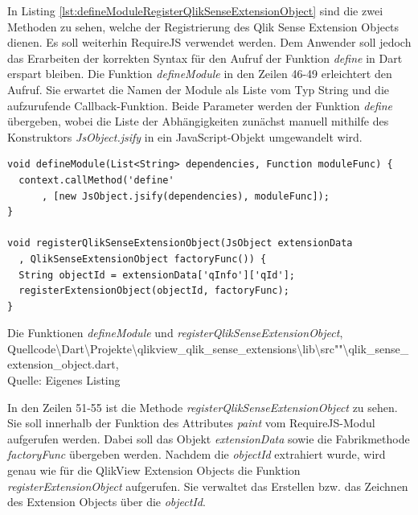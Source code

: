 In Listing \ref{lst:defineModuleRegisterQlikSenseExtensionObject} sind die zwei Methoden zu sehen, welche der Registrierung des Qlik Sense Extension Objects dienen. Es soll weiterhin RequireJS verwendet werden. Dem Anwender soll jedoch das Erarbeiten der korrekten Syntax für den Aufruf der Funktion \textit{define} in Dart erspart bleiben. Die Funktion \textit{defineModule} in den Zeilen 46-49 erleichtert den Aufruf. Sie erwartet die Namen der Module als Liste vom Typ String und die aufzurufende Callback-Funktion. Beide Parameter werden der Funktion \textit{define} übergeben, wobei die Liste der Abhängig\-keiten zunächst manuell mithilfe des Konstruktors \textit{JsObject.jsify} in ein JavaScript-Objekt umgewandelt wird.



\begin{listing}[htbp]
\begin{verbatim}
void defineModule(List<String> dependencies, Function moduleFunc) {
  context.callMethod('define'
      , [new JsObject.jsify(dependencies), moduleFunc]);
}

void registerQlikSenseExtensionObject(JsObject extensionData
  , QlikSenseExtensionObject factoryFunc()) {
  String objectId = extensionData['qInfo']['qId'];
  registerExtensionObject(objectId, factoryFunc);
}
\end{verbatim}
\caption[Die Funktionen \textit{defineModule} und \textit{registerQlikSenseExtensionObject}]{Die Funktionen \textit{defineModule} und \textit{registerQlikSenseExtensionObject}, \\Quellcode\textbackslash{}Dart\textbackslash{}Projekte\textbackslash{}qlikview\_qlik\_sense\_extensions\textbackslash{}lib\textbackslash{}src""\textbackslash{}qlik\_sense\_extension\_object.dart, \\Quelle: Eigenes Listing}
\label{lst:defineModuleRegisterQlikSenseExtensionObject}
\end{listing}

In den Zeilen 51-55 ist die Methode \textit{registerQlikSenseExtensionObject} zu sehen. Sie soll innerhalb der Funktion des Attributes \textit{paint} vom RequireJS-Modul aufgerufen werden. Dabei soll das Objekt \textit{extensionData} sowie die Fabrikmethode \textit{factoryFunc} übergeben werden. Nachdem die \textit{objectId} extrahiert wurde, wird genau wie für die QlikView Extension Objects die Funktion \textit{registerExtensionObject} aufgerufen. Sie verwaltet das Erstellen bzw. das Zeichnen des Extension Objects über die \textit{objectId}.

